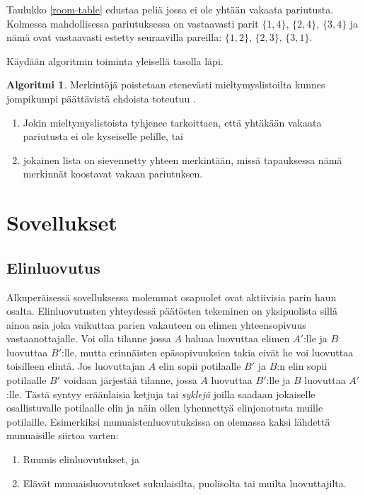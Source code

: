 \documentclass[finnish]{tktltiki2}
\theoremstyle{definition}
\newtheorem{alg}[lau]{Algoritmi}
\theoremstyle{remark}
\begin{document}
Taulukko \ref{room-table} edustaa peliä jossa ei ole yhtään vakaata pariutusta. Kolmessa mahdollisessa pariutuksessa on vastaavasti parit $\{1,4\}$, $\{2,4\}$, $\{3,4\}$ ja nämä ovat vastaavasti estetty seuraavilla pareilla: $\{1,2\}$, $\{2,3\}$, $\{3,1\}$.

Käydään algoritmin toiminta yleisellä tasolla läpi. 
\begin{alg}\label{srp1}
Merkintöjä poistetaan etenevästi mieltymyslistoilta kunnes jompikumpi päättävistä ehdoista toteutuu \cite[s. 165]{gusfield1989stable}.
\begin{enumerate}
	\item Jokin mieltymyslistoista tyhjenee tarkoittaen, että yhtäkään vakaata pariutusta ei ole kyseiselle pelille, tai
	\item jokainen lista on sievennetty yhteen merkintään, missä tapauksessa nämä merkinnät koostavat vakaan pariutuksen.
\end{enumerate}
\end{alg}

\section{Sovellukset}
\subsection{Elinluovutus}
Alkuperäisessä sovelluksessa molemmat osapuolet ovat aktiivisia parin haun osalta. Elinluovutusten yhteydessä päätösten tekeminen on yksipuolista sillä ainoa asia joka vaikuttaa parien vakauteen on elimen yhteensopivuus vastaanottajalle. Voi olla tilanne jossa $A$ haluaa luovuttaa elimen $A'$:lle ja $B$ luovuttaa $B'$:lle, mutta erinnäisten epäsopivuuksien takia eivät he voi luovuttaa toisilleen elintä. Jos luovuttajan $A$ elin sopii potilaalle $B'$ ja $B$:n elin sopii potilaalle $B'$ voidaan järjestää tilanne, jossa $A$ luovuttaa $B'$:lle ja $B$ luovuttaa $A'$:lle. Tästä syntyy eräänlaisia ketjuja tai \emph{syklejä} joilla saadaan jokaiselle osallistuvalle potilaalle elin ja näin ollen lyhennettyä elinjonotusta muille potilaille.
Esimerkiksi munuaistenluovutuksissa on olemassa kaksi lähdettä munuaisille siirtoa varten:
\begin{enumerate}
	\item Ruumis elinluovutukset, ja
	\item Elävät munuaisluovutukset sukulaisilta, puolisolta tai muilta luovuttajilta. \cite[s. 6]{NBERw10002}
\end{enumerate}
\end{document}
